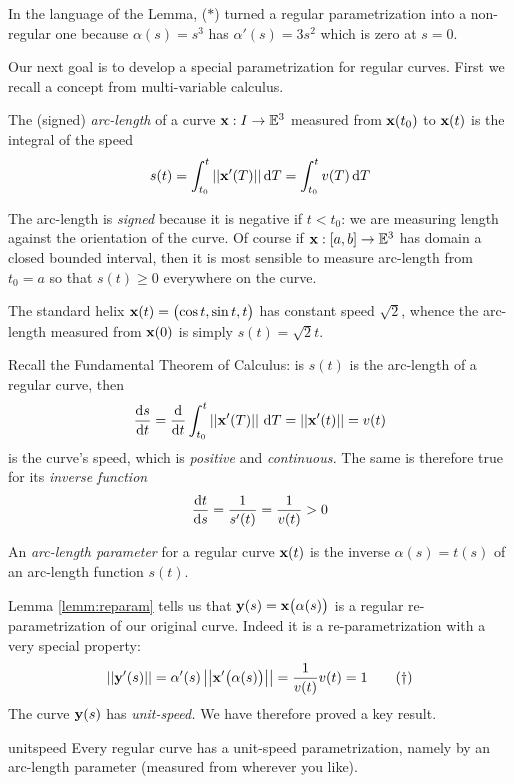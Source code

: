 In the language of the Lemma, ($\ast$) turned a regular parametrization into a non-regular one because $\alpha(s)=s^3$ has $\alpha'(s)=3s^2$ which is zero at $s=0$.\bigbreak

Our next goal is to develop a special parametrization for regular curves. First we recall a concept from multi-variable calculus.

\begin{defn}{}{}
The (signed) \emph{arc-length} of a curve $\vx:I\to\E^3$ measured from $\vx(t_0)$ to $\vx(t)$ is the integral of the speed
\[s(t)=\int_{t_0}^t\Nm{\vx'(T)}\D T =\int_{t_0}^tv(T)\,\D T\]
\end{defn}

The arc-length is \emph{signed} because it is negative if $t<t_0$: we are measuring length against the orientation of the curve. Of course if $\vx:[a,b]\to\E^3$ has domain a closed bounded interval, then it is most sensible to measure arc-length from $t_0=a$ so that $s(t)\ge 0$ everywhere on the curve.

\begin{example}{}{}
The standard helix $\vx(t)=\bigl(\cos t,\sin t,t\bigr)$ has constant speed $\sqrt 2$, whence the arc-length measured from $\vx(0)$ is simply $s(t)=\sqrt 2t$.
\end{example}

Recall the Fundamental Theorem of Calculus: is $s(t)$ is the arc-length of a regular curve, then
\[\diff[s]{t}=\diff t\int_{t_0}^t\Nm{\vx'(T)}\,\D T=\Nm{\vx'(t)}=v(t)\]
is the curve's speed, which is \emph{positive} and \emph{continuous.} The same is therefore true for its \emph{inverse function}
\[\diff[t]{s}=\frac 1{s'(t)}=\frac 1{v(t)}>0\]

\begin{defn}{}{}
An \emph{arc-length parameter} for a regular curve $\vx(t)$ is the inverse $\alpha(s)=t(s)$ of an arc-length function $s(t)$.
\end{defn}

Lemma \ref{lemm:reparam} tells us that $\vy(s)=\vx\bigl(\alpha(s)\bigr)$ is a regular re-parametrization of our original curve. Indeed it is a re-parametrization with a very special property:
\[\Nm{\vy'(s)}=\alpha'(s)\Nm{\vx'\bigl(\alpha(s)\bigr)}=\frac 1{v(t)}v(t)=1 \tag{$\dag$}\]
The curve $\vy(s)$ has \emph{unit-speed.} We have therefore proved a key result.

\begin{thm}{}{unitspeed}
Every regular curve has a unit-speed parametrization, namely by an arc-length parameter  (measured from wherever you like).
\end{thm}

